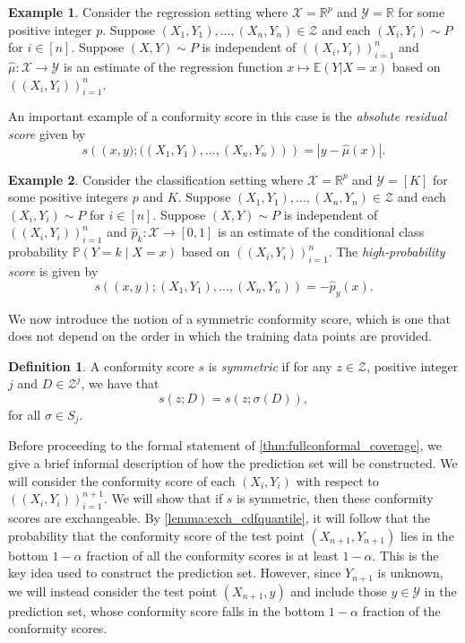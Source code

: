 \documentclass[11pt, titlepage]{article} %
\newcommand{\Prob}[1]{\mathbb{P}\left( #1 \right)}
\newcommand{\Exp}[3]{\mathbb{E}\left#2 #1 \right#3}
\numberwithin{equation}{section}
\theoremstyle{definition}
\newtheorem{definition}{Definition}
\newtheorem{example}{Example}
\numberwithin{theorem}{section}
\numberwithin{lemma}{section}
\numberwithin{corollary}{section}
\numberwithin{proposition}{section}
\numberwithin{definition}{section}
\numberwithin{remark}{section}
\begin{document}
\begin{example}
\label{example:absolute_residual_score}
    Consider the regression setting where \(\mathcal{X} = \mathbb{R}^p\) and \(\mathcal{Y} = \mathbb{R}\) for some positive integer \(p\). Suppose \((X_1, Y_1), \ldots, (X_n, Y_n) \in \mathcal{Z}\) and each \((X_i, Y_i) \sim P\) for \(i \in [n]\). Suppose \((X,Y) \sim P\) is independent of \(((X_i, Y_i))_{i=1}^n\) and \(\hat{\mu}: \mathcal{X} \to \mathcal{Y}\) is an estimate of the regression function \(x \mapsto \Exp{Y|X = x}{(}{)}\) based on \(((X_i, Y_i))_{i=1}^n\). \vskip5pt

    \noindent
    An important example of a conformity score in this case is the \textit{absolute residual score} given by \[s\left(\left(x,y); ((X_1, Y_1), \ldots, (X_n, Y_n)\right)\right) = |y - \hat{\mu}(x)|.\]
\end{example}

\begin{example}
\label{example:max_prob_score}
    Consider the classification setting where \(\mathcal{X} = \mathbb{R}^p\) and \(\mathcal{Y} = [K]\) for some positive integers \(p\) and \(K\). Suppose \((X_1, Y_1), \ldots, (X_n, Y_n) \in \mathcal{Z}\) and each \((X_i, Y_i) \sim P\) for \(i \in [n]\). Suppose \((X,Y) \sim P\) is independent of \(((X_i, Y_i))_{i=1}^n\) and \(\hat{p}_k: \mathcal{X} \to [0,1]\) is an estimate of the conditional class probability \(\Prob{Y = k \mid X = x}\) based on \(((X_i, Y_i))_{i=1}^n\). The \textit{high-probability score} \cite{angelopoulos2024theoreticalfoundationsconformalprediction} is given by \[
        s((x,y); (X_1, Y_1), \ldots, (X_n, Y_n)) = -\hat{p}_{y}(x).
    \]

\end{example}

\noindent
We now introduce the notion of a symmetric conformity score, which is one that does not depend on the order in which the training data points are provided.

\begin{definition}
    A conformity score \(s\) is \textit{symmetric} if for any \(z \in \mathcal{Z}\), positive integer \(j\) and \(D \in \mathcal{Z}^j\), we have that \[s(z; D) = s(z; \sigma(D)), \] for all \(\sigma \in S_j\).
\label{defn:symmetric_conformityscore}
\end{definition}

\noindent
Before proceeding to the formal statement of \cref{thm:fullconformal_coverage}, we give a brief informal description of how the prediction set will be constructed. We will consider the conformity score of each \((X_i, Y_i)\) with respect to \(((X_i, Y_i))_{i=1}^{n+1}\). We will show that if \(s\) is symmetric, then these conformity scores are exchangeable. By \cref{lemma:exch_cdfquantile}, it will follow that the probability that the conformity score of the test point \((X_{n+1}, Y_{n+1})\) lies in the bottom \(1-\alpha\) fraction of all the conformity scores is at least \(1-\alpha\). This is the key idea used to construct the prediction set. However, since \(Y_{n+1}\) is unknown, we will instead consider the test point \((X_{n+1}, y)\) and include those \(y \in \mathcal{Y}\) in the prediction set, whose conformity score falls in the bottom \(1-\alpha\) fraction of the conformity scores. \vskip5pt
\end{document}

